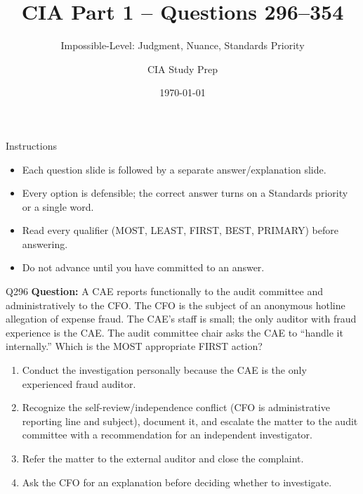 \documentclass[aspectratio=169,10pt]{beamer}
\title{CIA Part 1 -- Questions 296--354}
\subtitle{Impossible-Level: Judgment, Nuance, Standards Priority}
\author{CIA Study Prep}
\date{\today}
\begin{document}
	
	\begin{frame}
		\titlepage
	\end{frame}
	
	\begin{frame}{Instructions}
		\begin{itemize}
			\item Each question slide is followed by a separate answer/explanation slide.
			\item Every option is defensible; the correct answer turns on a Standards priority or a single word.
			\item Read every qualifier (MOST, LEAST, FIRST, BEST, PRIMARY) before answering.
			\item Do not advance until you have committed to an answer.
		\end{itemize}
	\end{frame}
	
	\begin{frame}[t]{Q296}
		\small
		\textbf{Question:} A CAE reports functionally to the audit committee and administratively to the CFO. The CFO is the subject of an anonymous hotline allegation of expense fraud. The CAE's staff is small; the only auditor with fraud experience is the CAE. The audit committee chair asks the CAE to ``handle it internally.'' Which is the MOST appropriate FIRST action?
		\begin{enumerate}[label=\Alph*.,itemsep=1pt,topsep=2pt]
			\item Conduct the investigation personally because the CAE is the only experienced fraud auditor.
			\item Recognize the self-review/independence conflict (CFO is administrative reporting line and subject), document it, and escalate the matter to the audit committee with a recommendation for an independent investigator.
			\item Refer the matter to the external auditor and close the complaint.
			\item Ask the CFO for an explanation before deciding whether to investigate.
		\end{enumerate}
	\end{frame}
	
\end{document}
